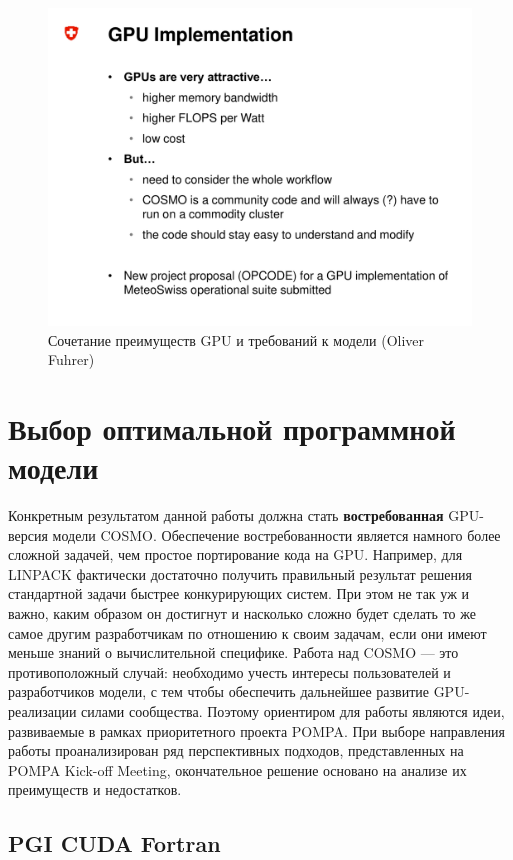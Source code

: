 \documentclass[a4,12pt]{report}
\begin{document}
\begin{figure}
\centering
\includegraphics[scale=0.4]{slides/02.pdf}
\caption{Сочетание преимуществ GPU и требований к модели (Oliver Fuhrer)}
\label{fig:02}
\end{figure}


\chapter{Выбор оптимальной программной модели}

Конкретным результатом данной работы должна стать \textbf{востребованная} GPU-версия модели COSMO. Обеспечение востребованности является намного более сложной задачей, чем простое портирование кода на GPU. Например, для LINPACK фактически достаточно получить правильный результат решения стандартной задачи быстрее конкурирующих систем. При этом не так уж и важно, каким образом он достигнут и насколько сложно будет сделать то же самое другим разработчикам по отношению к своим задачам, если они имеют меньше знаний о вычислительной специфике. Работа над COSMO --- это противоположный случай: необходимо учесть интересы пользователей и разработчиков модели, с тем чтобы обеспечить дальнейшее развитие GPU-реализации силами сообщества. Поэтому ориентиром для работы являются идеи, развиваемые в рамках приоритетного проекта POMPA. При выборе направления работы проанализирован ряд перспективных подходов, представленных на POMPA Kick-off Meeting, окончательное решение основано на анализе их преимуществ и недостатков.

\section{PGI CUDA Fortran}
\end{document}

